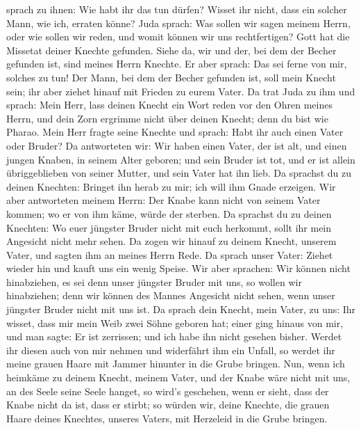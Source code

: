 sprach zu ihnen: Wie habt ihr das tun dürfen? Wisset ihr nicht, dass ein
solcher Mann, wie ich, erraten könne?  Juda sprach: Was
sollen wir sagen meinem Herrn, oder wie sollen wir reden, und womit
können wir uns rechtfertigen? Gott hat die Missetat deiner Knechte
gefunden. Siehe da, wir und der, bei dem der Becher gefunden ist, sind
meines Herrn Knechte.  Er aber sprach: Das sei ferne von
mir, solches zu tun! Der Mann, bei dem der Becher gefunden ist, soll
mein Knecht sein; ihr aber ziehet hinauf mit Frieden zu eurem Vater.
 Da trat Juda zu ihm und sprach: Mein Herr, lass deinen
Knecht ein Wort reden vor den Ohren meines Herrn, und dein Zorn ergrimme
nicht über deinen Knecht; denn du bist wie Pharao.  Mein
Herr fragte seine Knechte und sprach: Habt ihr auch einen Vater oder
Bruder?  Da antworteten wir: Wir haben einen Vater, der ist
alt, und einen jungen Knaben, in seinem Alter geboren; und sein Bruder
ist tot, und er ist allein übriggeblieben von seiner Mutter, und sein
Vater hat ihn lieb.  Da sprachst du zu deinen Knechten:
Bringet ihn herab zu mir; ich will ihm Gnade erzeigen.  Wir
aber antworteten meinem Herrn: Der Knabe kann nicht von seinem Vater
kommen; wo er von ihm käme, würde der sterben.  Da sprachst
du zu deinen Knechten: Wo euer jüngster Bruder nicht mit euch herkommt,
sollt ihr mein Angesicht nicht mehr sehen.  Da zogen wir
hinauf zu deinem Knecht, unserem Vater, und sagten ihm an meines Herrn
Rede.  Da sprach unser Vater: Ziehet wieder hin und kauft
uns ein wenig Speise.  Wir aber sprachen: Wir können nicht
hinabziehen, es sei denn unser jüngster Bruder mit uns, so wollen wir
hinabziehen; denn wir können des Mannes Angesicht nicht sehen, wenn
unser jüngster Bruder nicht mit uns ist.  Da sprach dein
Knecht, mein Vater, zu uns: Ihr wisset, dass mir mein Weib zwei Söhne
geboren hat;  einer ging hinaus von mir, und man sagte: Er
ist zerrissen; und ich habe ihn nicht gesehen bisher. 
Werdet ihr diesen auch von mir nehmen und widerfährt ihm ein Unfall, so
werdet ihr meine grauen Haare mit Jammer hinunter in die Grube bringen.
 Nun, wenn ich heimkäme zu deinem Knecht, meinem Vater, und
der Knabe wäre nicht mit uns, an des Seele seine Seele hanget,
 so wird's geschehen, wenn er sieht, dass der Knabe nicht
da ist, dass er stirbt; so würden wir, deine Knechte, die grauen Haare
deines Knechtes, unseres Vaters, mit Herzeleid in die Grube bringen.
